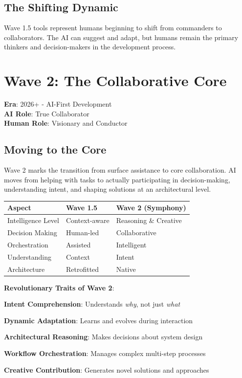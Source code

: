 \subsection{The Shifting Dynamic}
\label{subsec:wave-1-5-dynamic}

Wave 1.5 tools represent humans beginning to shift from commanders to collaborators. The AI can suggest and adapt, but humans remain the primary thinkers and decision-makers in the development process.

\section{Wave 2: The Collaborative Core}
\label{sec:wave-2}

\textbf{Era}: 2026+ - AI-First Development\\
\textbf{AI Role}: True Collaborator\\
\textbf{Human Role}: Visionary and Conductor

\subsection{Moving to the Core}
\label{subsec:wave-2-core}

Wave 2 marks the transition from surface assistance to core collaboration. AI moves from helping with tasks to actually participating in decision-making, understanding intent, and shaping solutions at an architectural level.

\begin{center}
\begin{tabular}{@{}lll@{}}
\toprule
\textbf{Aspect} & \textbf{Wave 1.5} & \textbf{Wave 2 (Symphony)} \\
\midrule
Intelligence Level & Context-aware & Reasoning \& Creative \\
Decision Making & Human-led & Collaborative \\
Orchestration & Assisted & Intelligent \\
Understanding & Context & Intent \\
Architecture & Retrofitted & Native \\
\bottomrule
\end{tabular}
\label{tab:wave15-vs-wave2-comparison}
\end{center}

\textbf{Revolutionary Traits of Wave 2}:
\begin{expandedlist}
    \item \textbf{Intent Comprehension}: Understands \textit{why}, not just \textit{what}
    \item \textbf{Dynamic Adaptation}: Learns and evolves during interaction
    \item \textbf{Architectural Reasoning}: Makes decisions about system design
    \item \textbf{Workflow Orchestration}: Manages complex multi-step processes
    \item \textbf{Creative Contribution}: Generates novel solutions and approaches
\end{expandedlist}

